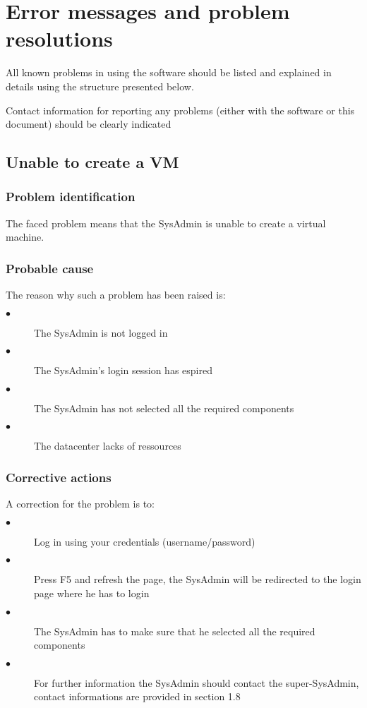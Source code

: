 
\chapter{Error messages and problem resolutions}
\label{chap:error_messages}

All known problems in using the software should be listed and explained in
details using the structure presented below.

Contact information for reporting any problems (either with the software or
this document) should be clearly indicated


\section{Unable to create a VM}

\subsection{Problem identification}
The faced problem means that the SysAdmin is unable to create a virtual machine.

\subsection{Probable cause}

The reason why such a problem has been raised is:\\
\begin{description}
  \item[$\bullet$] The SysAdmin is not logged in
  \item[$\bullet$] The SysAdmin's login session has espired
  \item[$\bullet$] The SysAdmin has not selected all the required components
  \item[$\bullet$] The datacenter lacks of ressources
\end{description}


\subsection{Corrective actions}

A correction for the problem is to:\\
\begin{description}
  \item[$\bullet$] Log in using your credentials (username/password)
  \item[$\bullet$] Press F5 and refresh the page, the SysAdmin will be redirected to
  the login page where he has to login
  \item[$\bullet$] The SysAdmin has to make sure that he selected all the required
  components
  \item[$\bullet$] For further information the SysAdmin should contact the
  super-SysAdmin, contact informations are provided in section 1.8
\end{description}













